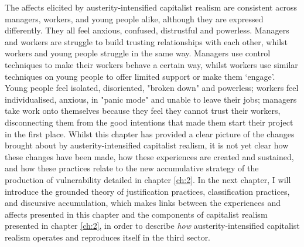 The affects elicited by austerity-intensified capitalist realism are consistent across managers, workers, and young people alike, although they are expressed differently. They all feel anxious, confused, distrustful and powerless. Managers and workers are struggle to build trusting relationships with each other, whilst workers and young people struggle in the same way. Managers use control techniques to make their workers behave a certain way, whilst workers use similar techniques on young people to offer limited support or make them `engage'. Young people feel isolated, disoriented, "broken down" and powerless; workers feel individualised, anxious, in "panic mode" and unable to leave their jobs; managers take work onto themselves because they feel they cannot trust their workers, disconnecting them from the good intentions that made them start their project in the first place. Whilst this chapter has provided a clear picture of the changes brought about by austerity-intensified capitalist realism, it is not yet clear how these changes have been made, how these experiences are created and sustained, and how these practices relate to the new accumulative strategy of the production of vulnerability detailed in chapter \ref{ch:2}. In the next chapter, I will introduce the grounded theory of justification practices, classification practices, and discursive accumulation, which makes links between the experiences and affects presented in this chapter and the components of capitalist realism presented in chapter \ref{ch:2}, in order to describe \emph{how} austerity-intensified capitalist realism operates and reproduces itself in the third sector. 
